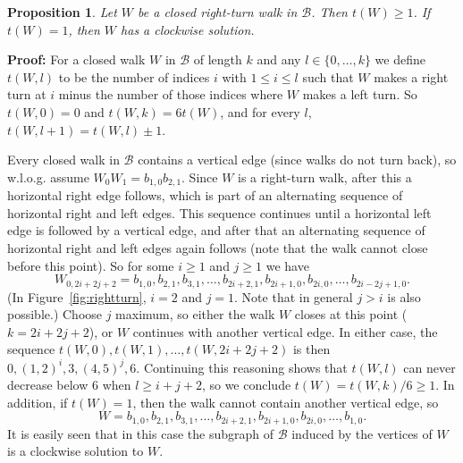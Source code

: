 \documentclass{llncs}
\newcommand{\PF}{{\bf Proof: }}
\newcommand{\QED}{\hspace*{\fill}{$\Box$}\medskip}
\newcommand{\BW}{\mathcal{B}}
\newtheorem{propo}[thm]{Proposition}
\begin{document}
\begin{propo}
\label{propo:turnnum_closedrightturnwalk}
Let $W$ be a closed right-turn walk in $\BW$. Then $t(W)\geq 1$. If $t(W)=1$, then $W$ has a clockwise solution.
\end{propo}

\PF
For a closed walk $W$ in $\BW$ of length $k$ and any $l\in \{0,\ldots,k\}$ we define $t(W,l)$ to be the number of indices $i$ with $1\leq i\leq l$ such that $W$ makes a right turn at $i$ minus the number of those indices where $W$ makes a left turn. So $t(W,0)=0$ and $t(W,k)=6t(W)$, and for every $l$, $t(W,l+1)=t(W,l)\pm 1$.

Every closed walk in $\BW$ contains a vertical edge (since walks do not turn back), so w.l.o.g. assume $W_0W_1=b_{1,0}b_{2,1}$. Since $W$ is a right-turn walk, after this a horizontal right edge follows, which is part of an alternating sequence of horizontal right and left edges. This sequence continues until a horizontal left edge is followed by a vertical edge, and after that an alternating sequence of horizontal right and left edges again follows (note that the walk cannot close before this point).
So for some $i\geq 1$ and $j\geq 1$ we have 
\[
W_{0,2i+2j+2}=b_{1,0},b_{2,1},b_{3,1},\ldots,b_{2i+2,1},b_{2i+1,0},b_{2i,0},\ldots,b_{2i-2j+1,0}.
\]
(In Figure~\ref{fig:rightturn}, $i=2$ and $j=1$. Note that in general $j>i$ is also possible.)
Choose $j$ maximum, so either the walk $W$ closes at this point ($k=2i+2j+2$), or $W$ continues with another vertical edge.
In either case, the sequence $t(W,0),t(W,1),\ldots,t(W,2i+2j+2)$ is then $0,(1,2)^i,3,(4,5)^j,6$.
Continuing this reasoning shows that $t(W,l)$ can never decrease below 6 when $l\geq i+j+2$, so we conclude $t(W)=t(W,k)/6\geq 1$. In addition, if $t(W)=1$, then the walk cannot contain another vertical edge, so
\[ W=b_{1,0},b_{2,1},b_{3,1},\ldots,b_{2i+2,1},b_{2i+1,0},b_{2i,0},\ldots,b_{1,0}.
\]
It is easily seen that in this case the subgraph of $\BW$ induced by the vertices of $W$ is a clockwise solution to $W$.
\QED
\end{document}
